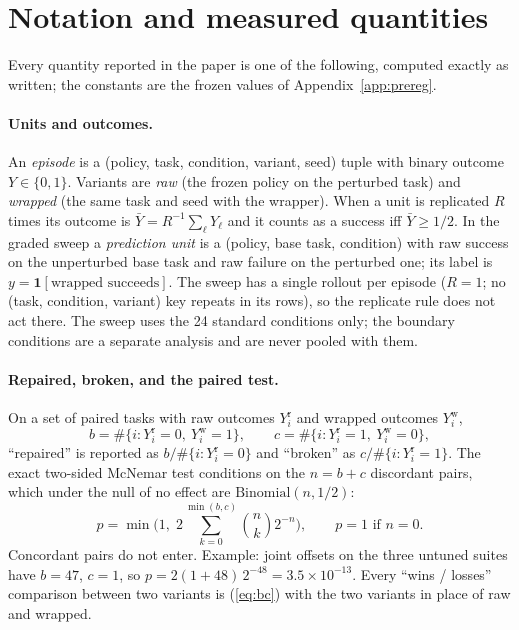 \documentclass{article}
\begin{document}
\appendix

\section{Notation and measured quantities}
\label{app:defs}
Every quantity reported in the paper is one of the following, computed exactly as written; the constants are the
frozen values of Appendix~\ref{app:prereg}.

\paragraph{Units and outcomes.} An \emph{episode} is a (policy, task, condition, variant, seed) tuple with binary outcome
$Y \in \{0,1\}$. Variants are \emph{raw} (the frozen policy on the perturbed task) and \emph{wrapped} (the same task and
seed with the wrapper). When a unit is replicated $R$ times its outcome is $\bar Y = R^{-1}\sum_{\ell} Y_\ell$ and it
counts as a success iff $\bar Y \ge 1/2$. In the graded sweep a \emph{prediction unit} is a (policy, base task,
condition) with raw success on the unperturbed base task and raw failure on the perturbed one; its label is
$y = \mathbf{1}[\text{wrapped succeeds}]$. The sweep has a single rollout per episode ($R = 1$; no (task, condition,
variant) key repeats in its rows), so the replicate rule does not act there. The sweep uses the 24 standard conditions only; the boundary conditions are
a separate analysis and are never pooled with them.

\paragraph{Repaired, broken, and the paired test.} On a set of paired tasks with raw outcomes $Y^{\mathrm r}_i$ and
wrapped outcomes $Y^{\mathrm w}_i$,
\begin{equation}
b = \#\{i : Y^{\mathrm r}_i = 0,\ Y^{\mathrm w}_i = 1\},\qquad
c = \#\{i : Y^{\mathrm r}_i = 1,\ Y^{\mathrm w}_i = 0\},
\label{eq:bc}
\end{equation}
``repaired'' is reported as $b / \#\{i : Y^{\mathrm r}_i = 0\}$ and ``broken'' as $c / \#\{i : Y^{\mathrm r}_i = 1\}$.
The exact two-sided McNemar test conditions on the $n = b + c$ discordant pairs, which under the null of no effect
are $\mathrm{Binomial}(n, 1/2)$:
\begin{equation}
p = \min\Big(1,\; 2 \sum_{k=0}^{\min(b,c)} \binom{n}{k} 2^{-n}\Big),\qquad p = 1 \text{ if } n = 0 .
\label{eq:mcnemar}
\end{equation}
Concordant pairs do not enter. Example: joint offsets on the three untuned suites have $b = 47$, $c = 1$, so
$p = 2(1 + 48)\,2^{-48} = 3.5\times10^{-13}$. Every ``wins / losses'' comparison between two variants is
(\ref{eq:bc}) with the two variants in place of raw and wrapped.
\end{document}
